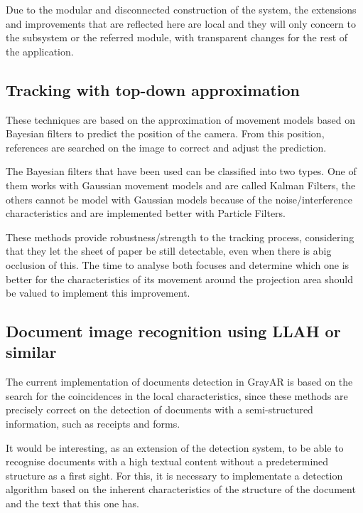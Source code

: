 Due to the modular and disconnected construction of the system, the extensions and improvements that are reflected here are local and they will only concern to the subsystem or the referred module, with transparent changes for the
rest of the application.


\subsection{Tracking with top-down approximation}
These techniques are based on the approximation of movement models based on Bayesian filters to predict the position of the camera. From this position, references are searched on the image to correct and adjust the prediction. 

The Bayesian filters that have been used can be classified into two types. One of them works with Gaussian movement models and are called Kalman Filters, the others cannot be model with Gaussian models because of the noise/interference
characteristics and are implemented better with Particle Filters.

These methods provide robustness/strength to the tracking process, considering that they let the sheet of paper be still detectable, even when there is abig occlusion of this. The time to analyse both focuses and determine which one is
better for the characteristics of its movement around the projection area should be valued to implement this improvement.

\subsection{Document image recognition using LLAH or similar} %
The current implementation of documents detection in GrayAR is based on the search for the coincidences in the local characteristics, since these methods are precisely correct on the detection of documents with a semi-structured information, such as receipts and forms.

It would be interesting, as an extension of the detection system, to be able to recognise documents with a high textual content without a predetermined structure as a first sight. For this, it is necessary to implementate a detection algorithm based on the inherent characteristics of the structure of the document and the text that this one has.

